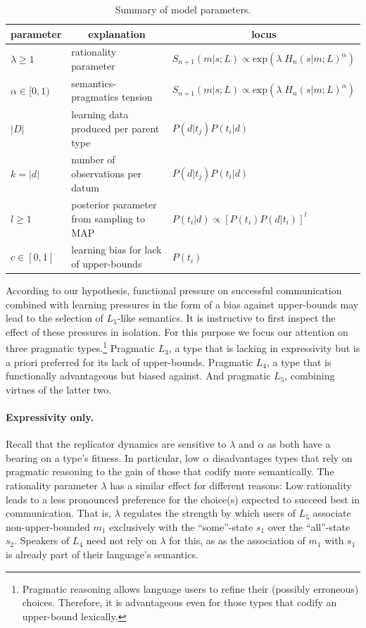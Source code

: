 \documentclass[a4paper]{article}
\begin{document}
\begin{table}
\centering
\begin{tabular}{l|l|l}
    \multicolumn{1}{c}{parameter} & \multicolumn{1}{c}{explanation} & \multicolumn{1}{c}{locus}\\ \hline
    $\lambda \geq 1$ & rationality parameter & $S_{n+1}(m|s;L) \propto \text{exp}(\lambda \; H_{n}(s|m;L)^\alpha)$\\
    $\alpha \in [0,1)$ & semantics-pragmatics tension & $S_{n+1}(m|s;L) \propto \text{exp}(\lambda \; H_{n}(s|m;L)^\alpha)$\\ 
    $|D|$ & learning data produced per parent type & $P(d|t_j)P(t_i|d)$\\
    $k = |d|$ & number of observations per datum& $P(d|t_j)P(t_i|d)$\\
    $l \geq 1$ & posterior parameter from sampling to MAP & $P(t_i|d) \propto [P(t_i)P(d|t_i)]^l$\\
    $c \in [0,1]$ & learning bias for lack of upper-bounds &  $P(t_i)$
\end{tabular}
\caption{Summary of model parameters.} 
\label{tab:summary}
\end{table}

According to our hypothesis, functional pressure on successful communication combined with learning pressures in the form of a bias against upper-bounds may lead to the selection of $L_5$-like semantics. It is instructive to first inspect the effect of these pressures in isolation. For this purpose we focus our attention on three pragmatic types.\footnote{Pragmatic reasoning allows language users to refine their (possibly erroneous) choices. Therefore, it is advantageous even for those types that codify an upper-bound lexically.} Pragmatic $L_3$, a type that is lacking in expressivity but is a priori preferred for its lack of upper-bounds. Pragmatic $L_4$, a type that is functionally advantageous but biased against. And pragmatic $L_5$, combining virtues of the latter two.  

\paragraph{Expressivity only.} Recall that the replicator dynamics are sensitive to $\lambda$ and $\alpha$ as both have a bearing on a type's fitness. In particular, low $\alpha$ disadvantages types that rely on pragmatic reasoning to the gain of those that codify more semantically. The rationality parameter $\lambda$ has a similar effect for different reasons: Low rationality leads to a less pronounced preference for the choice(s) expected to succeed best in communication. That is, $\lambda$ regulates the strength by which users of $L_5$ associate non-upper-bounded $m_1$ exclusively with the ``some''-state $s_1$ over the ``all''-state $s_2$. Speakers of $L_4$ need not rely on $\lambda$ for this, as as the association of $m_1$ with $s_1$ is already part of their language's semantics.
\end{document}
